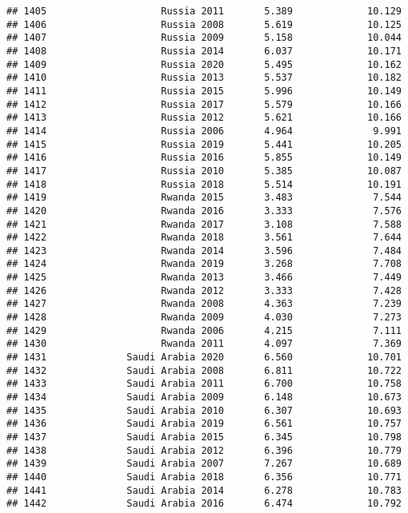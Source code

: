 \documentclass[
]{article}
\begin{document}
\begin{verbatim}
## 1405                    Russia 2011       5.389             10.129
## 1406                    Russia 2008       5.619             10.125
## 1407                    Russia 2009       5.158             10.044
## 1408                    Russia 2014       6.037             10.171
## 1409                    Russia 2020       5.495             10.162
## 1410                    Russia 2013       5.537             10.182
## 1411                    Russia 2015       5.996             10.149
## 1412                    Russia 2017       5.579             10.166
## 1413                    Russia 2012       5.621             10.166
## 1414                    Russia 2006       4.964              9.991
## 1415                    Russia 2019       5.441             10.205
## 1416                    Russia 2016       5.855             10.149
## 1417                    Russia 2010       5.385             10.087
## 1418                    Russia 2018       5.514             10.191
## 1419                    Rwanda 2015       3.483              7.544
## 1420                    Rwanda 2016       3.333              7.576
## 1421                    Rwanda 2017       3.108              7.588
## 1422                    Rwanda 2018       3.561              7.644
## 1423                    Rwanda 2014       3.596              7.484
## 1424                    Rwanda 2019       3.268              7.708
## 1425                    Rwanda 2013       3.466              7.449
## 1426                    Rwanda 2012       3.333              7.428
## 1427                    Rwanda 2008       4.363              7.239
## 1428                    Rwanda 2009       4.030              7.273
## 1429                    Rwanda 2006       4.215              7.111
## 1430                    Rwanda 2011       4.097              7.369
## 1431              Saudi Arabia 2020       6.560             10.701
## 1432              Saudi Arabia 2008       6.811             10.722
## 1433              Saudi Arabia 2011       6.700             10.758
## 1434              Saudi Arabia 2009       6.148             10.673
## 1435              Saudi Arabia 2010       6.307             10.693
## 1436              Saudi Arabia 2019       6.561             10.757
## 1437              Saudi Arabia 2015       6.345             10.798
## 1438              Saudi Arabia 2012       6.396             10.779
## 1439              Saudi Arabia 2007       7.267             10.689
## 1440              Saudi Arabia 2018       6.356             10.771
## 1441              Saudi Arabia 2014       6.278             10.783
## 1442              Saudi Arabia 2016       6.474             10.792

\end{verbatim}
\end{document}
